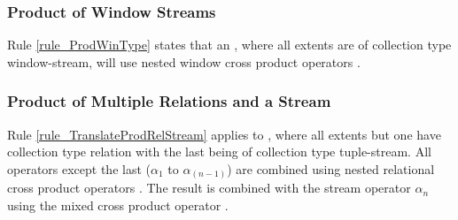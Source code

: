 \subsubsection{Product of Window Streams}

Rule \ref{rule_ProdWinType} states that an , where all
extents are of collection type window-stream,  will use nested window cross product operators .


\subsubsection{Product of Multiple Relations and a Stream}

Rule \ref{rule_TranslateProdRelStream} applies to ,
where all extents but one have collection type relation with the last
being of collection type tuple-stream.
All operators except the last ($\alpha_1$ to $\alpha_{(n-1)}$) are combined using nested relational cross product operators .
The result is combined with the stream operator $\alpha_n$ using the mixed cross product operator .


